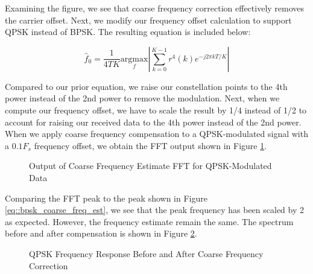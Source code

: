 \documentclass{article}
\begin{document}
\noindent Examining the figure, we see that coarse frequency correction effectively removes the carrier offset. Next, we modify our frequency offset calculation to support QPSK instead of BPSK. The resulting equation is included below:

\begin{equation}
	\hat{f}_0 = \frac{1}{4TK}\underset{f}{\text{argmax}}\left\vert\sum_{k=0}^{K-1}{r^4(k)e^{-j2{\pi}kT/K}}\right\vert
\end{equation}

\noindent Compared to our prior equation, we raise our constellation points to the 4th power instead of the 2nd power to remove the modulation. Next, when we compute our frequency offset, we have to scale the result by 1/4 instead of 1/2 to account for raising our received data to the 4th power instead of the 2nd power. When we apply coarse frequency compensation to a QPSK-modulated signal with a $0.1F_s$ frequency offset, we obtain the FFT output shown in Figure \ref{fig::qpsk_coarse_freq_estimate}.

\begin{figure}[H]
	\centerline{}
	\caption{Output of Coarse Frequency Estimate FFT for QPSK-Modulated Data}
	\label{fig::qpsk_coarse_freq_estimate}
\end{figure}

\noindent Comparing the FFT peak to the peak shown in Figure \ref{eq::bpsk_coarse_freq_est}, we see that the peak frequency has been scaled by 2 as expected. However, the frequency estimate remain the same. The spectrum before and after compensation is shown in Figure \ref{fig::psd_qpsk_with_cfc}.
 
\begin{figure}[H]
	\centerline{}
	\caption{QPSK Frequency Response Before and After Coarse Frequency Correction}
	\label{fig::psd_qpsk_with_cfc}
\end{figure}
\end{document}
